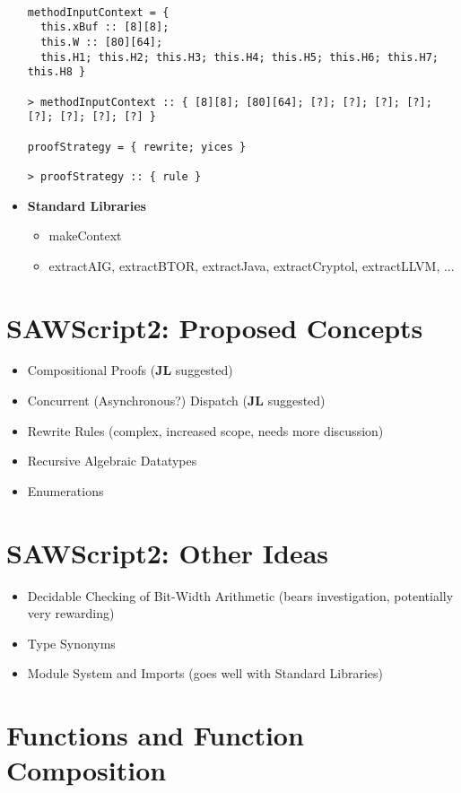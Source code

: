 \documentclass[11pt]{amsart}
\renewcommand{\b}[1]{\textbf{#1}}
\begin{document}
\begin{itemize}
\begin{verbatim}

methodInputContext = {
  this.xBuf :: [8][8];
  this.W :: [80][64];
  this.H1; this.H2; this.H3; this.H4; this.H5; this.H6; this.H7; this.H8 }

> methodInputContext :: { [8][8]; [80][64]; [?]; [?]; [?]; [?]; [?]; [?]; [?]; [?] }

proofStrategy = { rewrite; yices }

> proofStrategy :: { rule }

\end{verbatim}

\item \b{Standard Libraries}
\begin{itemize}
\item makeContext
\item extractAIG, extractBTOR, extractJava, extractCryptol, extractLLVM, ...
\end{itemize}
\end{itemize}

\section*{SAWScript2: Proposed Concepts}

\begin{itemize}
\item Compositional Proofs (\b{JL} suggested)
\item Concurrent (Asynchronous?) Dispatch (\b{JL} suggested)
\item Rewrite Rules (complex, increased scope, needs more discussion)
\item Recursive Algebraic Datatypes
\item Enumerations
\end{itemize}

\section*{SAWScript2: Other Ideas}
\begin{itemize}
\item Decidable Checking of Bit-Width Arithmetic (bears investigation, potentially very rewarding)
\item Type Synonyms
\item Module System and Imports (goes well with Standard Libraries)
\end{itemize}

\section*{Functions and Function Composition}

\section*{}
\end{document}
